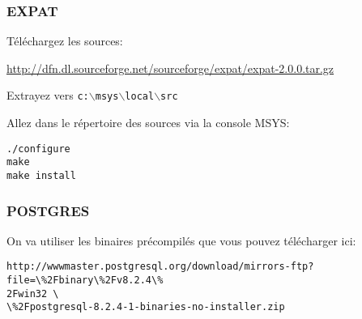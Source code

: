 % 
% 
% 
% 

\subsubsection{EXPAT}
T\'el\'echargez les sources:

\url{http://dfn.dl.sourceforge.net/sourceforge/expat/expat-2.0.0.tar.gz}

Extrayez vers \texttt{c:$\backslash$msys$\backslash$local$\backslash$src}

Allez dans le r\'epertoire des sources via la console MSYS:

\begin{verbatim}
./configure
make
make install
\end{verbatim}

% 
% 

\subsubsection{POSTGRES}
On va utiliser les binaires pr\'ecompil\'es que vous pouvez t\'el\'echarger ici:

\begin{verbatim}
http://wwwmaster.postgresql.org/download/mirrors-ftp?file=\%2Fbinary\%2Fv8.2.4\%
2Fwin32 \
\%2Fpostgresql-8.2.4-1-binaries-no-installer.zip
\end{verbatim}

